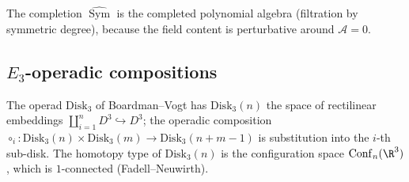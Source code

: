 \begin{remark}
The completion $\widehat{\operatorname{Sym}}$ is the completed
polynomial algebra (filtration by symmetric degree), because the field
content is perturbative around $\mathcal{A}=0$.
\end{remark}

\subsection{$E_3$-operadic compositions}
\label{subsec:E3-ops}

\begin{definition}
The operad $\mathrm{Disk}_3$ of Boardman--Vogt has
$\mathrm{Disk}_3(n)$ the space of rectilinear embeddings
$\coprod_{i=1}^n D^3 \hookrightarrow D^3$; the operadic composition
$\circ_i\colon \mathrm{Disk}_3(n)\times \mathrm{Disk}_3(m)\to
\mathrm{Disk}_3(n+m-1)$ is substitution into the $i$-th sub-disk. The
homotopy type of $\mathrm{Disk}_3(n)$ is the configuration space
$\mathrm{Conf}_n(\R^3)$, which is $1$-connected (Fadell--Neuwirth).
\end{definition}


